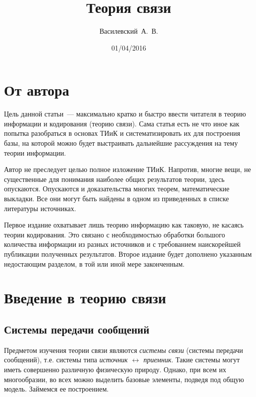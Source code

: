 \documentclass[12pt,a4paper,openright]{book}
\title{Теория связи}
\author{Василевский~А.~В.}
\date{01/04/2016}
\theoremstyle{definition}
\numberwithin{equation}{chapter}
\begin{document}
	

	\tableofcontents











	\chapter*{От автора}

	Цель данной статьи~--- максимально кратко и быстро ввести читателя в теорию информации и кодирования (теорию связи). Сама статья есть не что иное как попытка разобраться в основах ТИиК и систематизировать их для построения базы, на которой можно будет выстраивать дальнейшие рассуждения на тему теории информации.

	Автор не преследует целью полное изложение ТИиК. Напротив, многие вещи, не существенные для понимания наиболее общих результатов теории, здесь опускаются. Опускаются и доказательства многих теорем, математические выкладки. Все они могут быть найдены в одном из приведенных в списке литературы источниках.

	Первое издание охватывает лишь теорию информацию как таковую, не касаясь теории кодирования. Это связано с необходимостью обработки большого количества информации из разных источников и с требованием наискорейшей публикации полученных результатов. Второе издание будет дополнено указанным недостающим разделом, в той или иной мере законченным.











	\chapter{Введение в теорию связи}

	\section{Системы передачи сообщений}

	Предметом изучения теории связи являются \textit{системы связи} (системы передачи сообщений), т.е. системы типа \textit{источник $\leftrightarrow$ приемник}. Такие системы могут иметь совершенно различную физическую природу. Однако, при всем их многообразии, во всех можно выделить базовые элементы, подведя под общую модель. Займемся ее построением.
\end{document}
